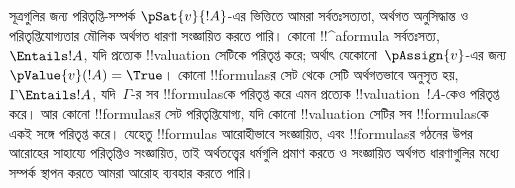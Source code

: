 \documentclass[../../../include/open-logic-section]{subfiles}
\begin{document}
সূত্রগুলির জন্য পরিতৃপ্তি-সম্পর্ক $\pSat{v}{!A}$-এর ভিত্তিতে আমরা
সর্বতঃসত্যতা, অর্থগত অনুসিদ্ধান্ত ও পরিতৃপ্তিযোগ্যতার মৌলিক অর্থগত ধারণা
সংজ্ঞায়িত করতে পারি। কোনো !!^a{formula} সর্বতঃসত্য,
$\Entails !A$, যদি প্রত্যেক !!{valuation} সেটিকে পরিতৃপ্ত করে; অর্থাৎ
যেকোনো~$\pAssign{v}$-এর জন্য $\pValue{v}(!A) = \True$। কোনো
!!{formula}sর সেট থেকে সেটি অর্থগতভাবে অনুসৃত হয়,
$\Gamma \Entails !A$, যদি~$\Gamma$-র সব !!{formula}sকে পরিতৃপ্ত করে
এমন প্রত্যেক !!{valuation}~$!A$-কেও পরিতৃপ্ত করে। আর কোনো
!!{formula}sর সেট পরিতৃপ্তিযোগ্য, যদি কোনো !!{valuation} সেটির সব
!!{formula}sকে একই সঙ্গে পরিতৃপ্ত করে। যেহেতু !!{formula}s আরোহীভাবে
সংজ্ঞায়িত, এবং !!{formula}sর গঠনের উপর আরোহের সাহায্যে পরিতৃপ্তিও সংজ্ঞায়িত,
তাই অর্থতত্ত্বের ধর্মগুলি প্রমাণ করতে ও সংজ্ঞায়িত অর্থগত ধারণাগুলির মধ্যে
সম্পর্ক স্থাপন করতে আমরা আরোহ ব্যবহার করতে পারি।
\end{document}
